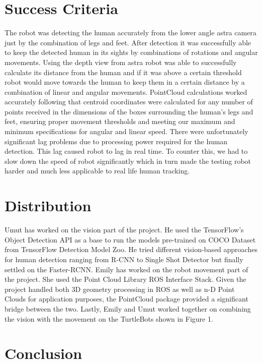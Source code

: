 \documentclass{ndjflart}
\theoremstyle{definition}
\theoremstyle{remark}
\begin{document}
\section{Success Criteria}\label{ams}
The robot was detecting the human accurately from the lower angle astra camera just by the combination of legs and feet. After detection it was successfully able to keep the detected human in its sights by combinations of rotations and angular movements. Using the depth view from astra robot was able to successfully calculate its distance from the human and if it was above a certain threshold robot would move towards the human to keep them in a certain distance by a combination of linear and angular movements. PointCloud calculations worked accurately following that centroid coordinates were calculated for any number of points received in the dimensions of the boxes surrounding the human's legs and feet, ensuring proper movement thresholds and meeting our maximum and minimum specifications for angular and linear speed. There were unfortunately significant lag problems due to processing power required for the human detection. This lag caused robot to lag in real time. To counter this, we had to slow down the speed of robot significantly which in turn made the testing robot harder and much less applicable to real life human tracking.

\section{Distribution}\label{refs} 

Umut has worked on the vision part of the project. He used the TensorFlow’s Object Detection API as a base to run the models pre-trained on COCO Dataset from TensorFlow Detection Model Zoo. He tried different vision-based approaches for human detection ranging from R-CNN to Single Shot Detector but finally settled on the Faster-RCNN. Emily has worked on the robot movement part of the project. She used the Point Cloud Library ROS Interface Stack. Given the project handled both 3D geometry processing in ROS as well as n-D Point Clouds for application purposes, the PointCloud package provided a significant bridge between the two. Lastly, Emily and Umut worked together on combining the vision with the movement on the TurtleBots shown in Figure 1.


\section{Conclusion}\label{whitesp}
\end{document}
